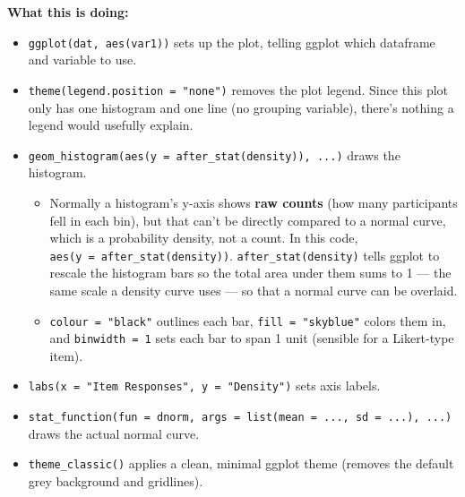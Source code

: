 \documentclass[
  letterpaper,
  DIV=11,
  numbers=noendperiod]{scrreprt}
\providecommand{\tightlist}{%
  \setlength{\itemsep}{0pt}\setlength{\parskip}{0pt}}\usepackage{longtable,booktabs,array}
\begin{document}
\textbf{What this is doing:}

\begin{itemize}
\tightlist
\item
  \texttt{ggplot(dat,\ aes(var1))} sets up the plot, telling ggplot
  which dataframe and variable to use.
\end{itemize}

\begin{itemize}
\tightlist
\item
  \texttt{theme(legend.position\ =\ "none")} removes the plot legend.
  Since this plot only has one histogram and one line (no grouping
  variable), there's nothing a legend would usefully explain.
\end{itemize}

\begin{itemize}
\item
  \texttt{geom\_histogram(aes(y\ =\ after\_stat(density)),\ ...)} draws
  the histogram.

  \begin{itemize}
  \item
    Normally a histogram's y-axis shows \textbf{raw counts} (how many
    participants fell in each bin), but that can't be directly compared
    to a normal curve, which is a probability density, not a count. In
    this code, \texttt{aes(y\ =\ after\_stat(density))}.
    \texttt{after\_stat(density)} tells ggplot to rescale the histogram
    bars so the total area under them sums to 1 --- the same scale a
    density curve uses --- so that a normal curve can be overlaid.
  \item
    \texttt{colour\ =\ "black"} outlines each bar,
    \texttt{fill\ =\ "skyblue"} colors them in, and
    \texttt{binwidth\ =\ 1} sets each bar to span 1 unit (sensible for a
    Likert-type item).
  \end{itemize}
\end{itemize}

\begin{itemize}
\tightlist
\item
  \texttt{labs(x\ =\ "Item\ Responses",\ y\ =\ "Density")} sets axis
  labels.
\end{itemize}

\begin{itemize}
\item
  \texttt{stat\_function(fun\ =\ dnorm,\ args\ =\ list(mean\ =\ ...,\ sd\ =\ ...),\ ...)}
  draws the actual normal curve.
\item
  \texttt{theme\_classic()} applies a clean, minimal ggplot theme
  (removes the default grey background and gridlines).
\end{itemize}
\end{document}
